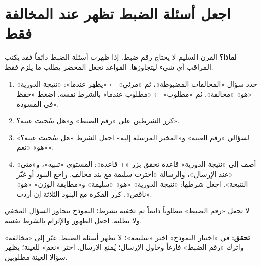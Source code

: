 \section{اجعل أسئلة الضبط تظهر عند المخالفة فقط}
\label{sec:real-rules}
\textbf{لماذا؟} الفرن السليم لا يحتاج رقم ضبط. إذا ظهرت أسئلة الضبط دائماً فقد يكتب المراقب أي شيء ليتجاوزها. القواعد تجعل المحضر يطلب ما يلزم فقط.
\begin{enumerate}
\item حدد سؤال «المخالفات المضبوطة»، ثم «مرئي» ← «يظهر عندما»: «نتيجة الدورية» «هو» «مخالفة». ثم «مطلوب» ← «مطلوب عندما» بالشرط نفسه. اضغط «حفظ في المسودة».
\item كرر الشرطين على «رقم الضبط» و«هل سُحبت عينة؟».
\item لسؤالي «رقم العينة» و«المخبر المرسلة إليه» اجعل الشرط «هل سُحبت عينة؟» «هو» «نعم».
\item أضف إلى «نتيجة الدورية» قاعدة تحقق بزر «+ قاعدة»: المستوى «تنبيه»، و«متى» «عند الإرسال»، والرسالة «اخترت سليمة مع بند مخالف. راجع البنود أو غيّر النتيجة». اجعل شرطها: «نتيجة الدورية» «هو» «سليمة» و«مطابقة الوزن» «هو» «ناقص». كرر الفكرة مع البنود الثلاثة إن أردت.
\end{enumerate}
\begin{rcwarn}
لا تجعل «رقم الضبط» مطلوباً دائماً ثم تخفيه بشرط؛ النموذج يتجاوز السؤال المخفي ولا يطلبه. اجعل الظهور والإلزام بالشرط نفسه.
\end{rcwarn}
\textbf{تحقق:} في «اختبار النموذج» اختر «سليمة»؛ لا تظهر أسئلة الضبط. غيّر إلى «مخالفة» واترك «رقم الضبط» فارغاً وحاول الإرسال؛ يُمنع الإرسال. اختر «نعم» للعينة؛ يظهر سؤالا العينة مطلوبين.

